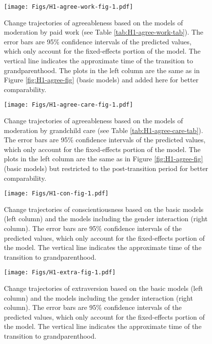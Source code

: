 \documentclass[
  english,
  man, noextraspace,floatsintext]{apa7}
\begin{document}
\begin{appendix}
\begin{figure}
\centering
\texttt{[image: Figs/H1-agree-work-fig-1.pdf]}
\caption{\label{fig:H1-agree-work-fig}Change trajectories of agreeableness based
on the models of moderation by paid work (see Table
\ref{tab:H1-agree-work-tab}). The error bars are 95\% confidence
intervals of the predicted values, which only account for the
fixed-effects portion of the model. The vertical line indicates the
approximate time of the transition to grandparenthood. The plots in the
left column are the same as in Figure \ref{fig:H1-agree-fig} (basic
models) and added here for better comparability.}
\end{figure}









\begin{figure}
\centering
\texttt{[image: Figs/H1-agree-care-fig-1.pdf]}
\caption{\label{fig:H1-agree-care-fig}Change trajectories of agreeableness based
on the models of moderation by grandchild care (see Table
\ref{tab:H1-agree-care-tab}). The error bars are 95\% confidence
intervals of the predicted values, which only account for the
fixed-effects portion of the model. The plots in the left column are the
same as in Figure \ref{fig:H1-agree-fig} (basic models) but restricted
to the post-transition period for better comparability.}
\end{figure}








\begin{figure}
\centering
\texttt{[image: Figs/H1-con-fig-1.pdf]}
\caption{\label{fig:H1-con-fig}Change trajectories of conscientiousness based on
the basic models (left column) and the models including the gender
interaction (right column). The error bars are 95\% confidence intervals
of the predicted values, which only account for the fixed-effects
portion of the model. The vertical line indicates the approximate time
of the transition to grandparenthood.}
\end{figure}








\begin{figure}
\centering
\texttt{[image: Figs/H1-extra-fig-1.pdf]}
\caption{\label{fig:H1-extra-fig}Change trajectories of extraversion based on the
basic models (left column) and the models including the gender
interaction (right column). The error bars are 95\% confidence intervals
of the predicted values, which only account for the fixed-effects
portion of the model. The vertical line indicates the approximate time
of the transition to grandparenthood.}
\end{figure}











\end{appendix}
\end{document}
